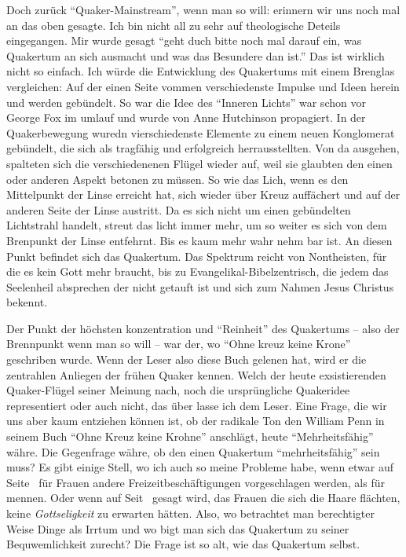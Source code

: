 Doch zurück "`Quaker-Mainstream"', wenn man so will: erinnern wir uns noch mal
an das oben gesagte. Ich bin nicht all zu sehr auf theologische Deteils
eingegangen. Mir wurde gesagt "`geht duch bitte noch mal darauf ein, was
Quakertum an sich ausmacht und was das Besundere dan ist."' Das ist wirklich
nicht so einfach. Ich würde die Entwicklung des Quakertums mit einem Brenglas
vergleichen: Auf der einen Seite vommen verschiedenste Impulse und Ideen herein
und werden gebündelt. So war die Idee des "`Inneren Lichts"' war schon vor
George Fox im umlauf und wurde von Anne Hutchinson propagiert. In der
Quakerbewegung wuredn vierschiedenste Elemente zu einem neuen Konglomerat
gebündelt, die sich als tragfähig und erfolgreich herrausstellten. Von da
ausgehen, spalteten sich die verschiedenenen Flügel wieder auf, weil sie
glaubten den einen oder anderen Aspekt betonen zu müssen. So wie das Lich, wenn
es den Mittelpunkt der Linse erreicht hat, sich wieder über Kreuz auffächert und
auf der anderen Seite der Linse austritt. Da es sich nicht um einen gebündelten
Lichtstrahl handelt, streut das licht immer mehr, um so weiter es sich von dem
Brenpunkt der Linse entfehrnt. Bis es kaum mehr wahr nehm bar ist. An diesen
Punkt befindet sich das Quakertum. Das Spektrum reicht von Nontheisten, für die
es kein Gott mehr braucht, bis zu Evangelikal-Bibelzentrisch, die jedem das
Seelenheil absprechen der nicht getauft ist und sich zum Nahmen Jesus Christus
bekennt.

\medskip

Der Punkt der höchsten konzentration und "`Reinheit"' des Quakertums -- also der
Brennpunkt wenn man so will -- war der, wo "`Ohne kreuz keine Krone"' geschriben
wurde. Wenn der Leser also diese Buch gelenen hat, wird er die zentrahlen
Anliegen der frühen Quaker kennen. Welch der heute exsistierenden Quaker-Flügel
seiner Meinung nach, noch die ursprüngliche Quakeridee representiert oder auch
nicht, das über lasse ich dem Leser. Eine Frage, die wir uns aber kaum entziehen
können ist, ob der radikale Ton den William Penn in seinem Buch "`Ohne Kreuz
keine Krohne"' anschlägt, heute "`Mehrheitsfähig"' währe. Die Gegenfrage währe,
ob den einen Quakertum "`mehrheitsfähig"' sein muss? Es gibt einige Stell, wo
ich auch so meine Probleme habe, wenn etwar auf Seite~\pageref{kap15_ab5} für
Frauen andere Freizeitbeschäftigungen vorgeschlagen werden, als für mennen. Oder
wenn auf Seit~\pageref{ref:haarflechten} gesagt wird, das Frauen die sich die
Haare flächten, keine \textit{Gottseligkeit} zu erwarten hätten. Also, wo
betrachtet man berechtigter Weise Dinge als Irrtum und wo bigt man sich das
Quakertum zu seiner Bequwemlichkeit zurecht? Die Frage ist so alt, wie das
Quakertum selbst.

